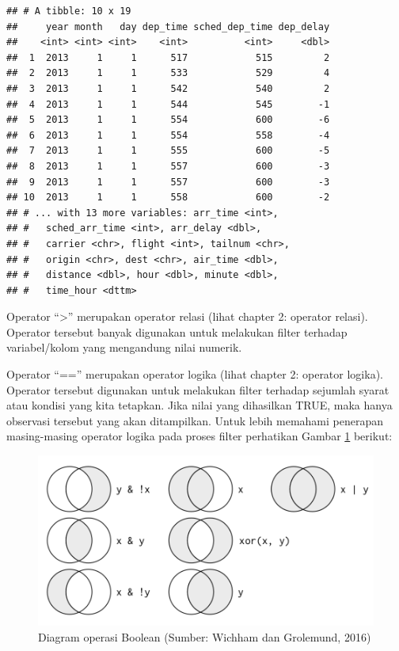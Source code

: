 \documentclass[]{book}
\begin{document}
\begin{verbatim}
## # A tibble: 10 x 19
##     year month   day dep_time sched_dep_time dep_delay
##    <int> <int> <int>    <int>          <int>     <dbl>
##  1  2013     1     1      517            515         2
##  2  2013     1     1      533            529         4
##  3  2013     1     1      542            540         2
##  4  2013     1     1      544            545        -1
##  5  2013     1     1      554            600        -6
##  6  2013     1     1      554            558        -4
##  7  2013     1     1      555            600        -5
##  8  2013     1     1      557            600        -3
##  9  2013     1     1      557            600        -3
## 10  2013     1     1      558            600        -2
## # ... with 13 more variables: arr_time <int>,
## #   sched_arr_time <int>, arr_delay <dbl>,
## #   carrier <chr>, flight <int>, tailnum <chr>,
## #   origin <chr>, dest <chr>, air_time <dbl>,
## #   distance <dbl>, hour <dbl>, minute <dbl>,
## #   time_hour <dttm>
\end{verbatim}

Operator ``\textgreater{}'' merupakan operator relasi (lihat chapter 2:
operator relasi). Operator tersebut banyak digunakan untuk melakukan
filter terhadap variabel/kolom yang mengandung nilai numerik.

Operator ``=='' merupakan operator logika (lihat chapter 2: operator
logika). Operator tersebut digunakan untuk melakukan filter terhadap
sejumlah syarat atau kondisi yang kita tetapkan. Jika nilai yang
dihasilkan TRUE, maka hanya observasi tersebut yang akan ditampilkan.
Untuk lebih memahami penerapan masing-masing operator logika pada proses
filter perhatikan Gambar \ref{fig:filter} berikut:

\begin{figure}

{\centering \includegraphics[width=6.57in]{filter} 

}

\caption{Diagram operasi Boolean (Sumber: Wichham dan Grolemund, 2016)}\label{fig:filter}
\end{figure}
\end{document}
